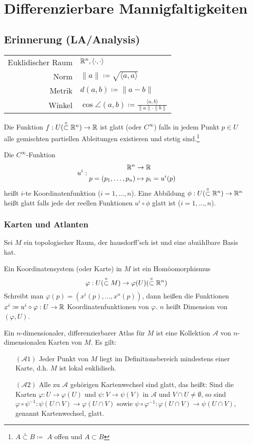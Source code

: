 \documentclass[a4paper,twoside,DIV15,BCOR12mm]{scrbook}
\newcommand{\otm}{\stackrel{\circ}{\subset}} %
\newcommand{\At}{\mathcal A}
\renewcommand{\da}{\coloneqq}
\begin{document}
\section{Differenzierbare Mannigfaltigkeiten}

\subsection*{Erinnerung (LA/Analysis)}
\begin{tabular}{rl}
Euklidischer Raum & $\mathbb{R}^n, \langle\cdot,\cdot\rangle$ \\
Norm & $ \|a\| \da  \sqrt{\langle a, a\rangle} $ \\
Metrik & $d(a,b) \da  \| a-b\| $ \\
Winkel & $\cos \angle(a,b) \da  \frac{\langle a, b\rangle}{\|a\|\cdot\|b\|} $ 
\end{tabular}

Die Funktion $f:U (\otm \MdR^n) \to \MdR$ ist glatt (oder $C^\infty$) falls in jedem Punkt $p\in U$ alle gemischten partiellen Ableitungen existieren und stetig sind.\footnote{$A\otm B \da  $ $A$ offen und $A\subset B$}

Die $C^\infty$-Funktion
\[ u^i:
\begin{aligned}
\mathbb{R}^n &\to \mathbb{R} \\
p = (p_1,\ldots,p_n) &\mapsto p_i =u^i(p)
\end{aligned}
\]
heißt $i$-te Koordinatenfunktion ($i=1,\ldots,n$). Eine Abbildung $\phi: U(\otm \MdR^n)\to \MdR^n$ heißt glatt falls jede der reellen Funktionen $u^i\circ\phi$ glatt ist ($i=1,\ldots,n$).

\subsubsection*{Karten und Atlanten}
Sei $M$ ein topologischer Raum, der hausdorff’sch ist und eine abzählbare Basis hat.

Ein Koordinatensystem (oder Karte) in $M$ ist ein Homöomorphismus
\[\varphi: U(\otm M) \to \varphi(U) (\otm\MdR^n) \]
Schreibt man $\varphi(p) = (x^i(p),\ldots,x^n(p))$, dann heißen die Funktionen $x^i \da  u^i\circ \varphi : U \to \MdR$ Koordinatenfunktionen von $\varphi$. $n$ heißt Dimension von $(\varphi,U)$.

Ein $n$-dimensionaler, differenzierbarer Atlas für $M$ ist eine Kollektion $\At$ von $n$-dimensionalen Karten von $M$. Es gilt:
\begin{itemize}
\item[$(\At1)$] Jeder Punkt von $M$ liegt im Definitionsbereich mindestens einer Karte, d.h. $M$ ist lokal euklidisch.
\item[$(\At2)$] Alle zu $\At$ gehörigen Kartenwechsel sind glatt, das heißt: Sind die Karten $\varphi: U\to \varphi(U)$ und $\psi:V\to\psi(V)$ in $\At$ und $V\cap U \ne \emptyset$, so sind $\varphi \circ \psi^{-1}: \psi(U\cap V) \to \varphi(U\cap V)$ sowie $\psi \circ \varphi^{-1}: \varphi(U\cap V) \to \psi(U \cap V)$, genannt Kartenwechsel, glatt.
\end{itemize}
\end{document}
